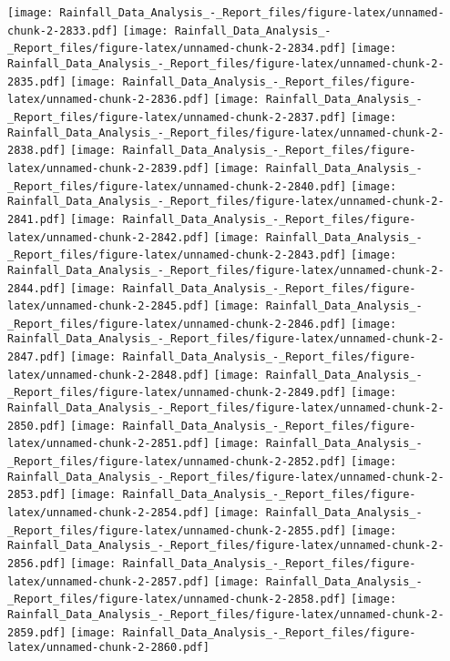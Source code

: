 \documentclass[
]{article}
\begin{document}
\texttt{[image: Rainfall\_Data\_Analysis\_-\_Report\_files/figure-latex/unnamed-chunk-2-2833.pdf]}
\texttt{[image: Rainfall\_Data\_Analysis\_-\_Report\_files/figure-latex/unnamed-chunk-2-2834.pdf]}
\texttt{[image: Rainfall\_Data\_Analysis\_-\_Report\_files/figure-latex/unnamed-chunk-2-2835.pdf]}
\texttt{[image: Rainfall\_Data\_Analysis\_-\_Report\_files/figure-latex/unnamed-chunk-2-2836.pdf]}
\texttt{[image: Rainfall\_Data\_Analysis\_-\_Report\_files/figure-latex/unnamed-chunk-2-2837.pdf]}
\texttt{[image: Rainfall\_Data\_Analysis\_-\_Report\_files/figure-latex/unnamed-chunk-2-2838.pdf]}
\texttt{[image: Rainfall\_Data\_Analysis\_-\_Report\_files/figure-latex/unnamed-chunk-2-2839.pdf]}
\texttt{[image: Rainfall\_Data\_Analysis\_-\_Report\_files/figure-latex/unnamed-chunk-2-2840.pdf]}
\texttt{[image: Rainfall\_Data\_Analysis\_-\_Report\_files/figure-latex/unnamed-chunk-2-2841.pdf]}
\texttt{[image: Rainfall\_Data\_Analysis\_-\_Report\_files/figure-latex/unnamed-chunk-2-2842.pdf]}
\texttt{[image: Rainfall\_Data\_Analysis\_-\_Report\_files/figure-latex/unnamed-chunk-2-2843.pdf]}
\texttt{[image: Rainfall\_Data\_Analysis\_-\_Report\_files/figure-latex/unnamed-chunk-2-2844.pdf]}
\texttt{[image: Rainfall\_Data\_Analysis\_-\_Report\_files/figure-latex/unnamed-chunk-2-2845.pdf]}
\texttt{[image: Rainfall\_Data\_Analysis\_-\_Report\_files/figure-latex/unnamed-chunk-2-2846.pdf]}
\texttt{[image: Rainfall\_Data\_Analysis\_-\_Report\_files/figure-latex/unnamed-chunk-2-2847.pdf]}
\texttt{[image: Rainfall\_Data\_Analysis\_-\_Report\_files/figure-latex/unnamed-chunk-2-2848.pdf]}
\texttt{[image: Rainfall\_Data\_Analysis\_-\_Report\_files/figure-latex/unnamed-chunk-2-2849.pdf]}
\texttt{[image: Rainfall\_Data\_Analysis\_-\_Report\_files/figure-latex/unnamed-chunk-2-2850.pdf]}
\texttt{[image: Rainfall\_Data\_Analysis\_-\_Report\_files/figure-latex/unnamed-chunk-2-2851.pdf]}
\texttt{[image: Rainfall\_Data\_Analysis\_-\_Report\_files/figure-latex/unnamed-chunk-2-2852.pdf]}
\texttt{[image: Rainfall\_Data\_Analysis\_-\_Report\_files/figure-latex/unnamed-chunk-2-2853.pdf]}
\texttt{[image: Rainfall\_Data\_Analysis\_-\_Report\_files/figure-latex/unnamed-chunk-2-2854.pdf]}
\texttt{[image: Rainfall\_Data\_Analysis\_-\_Report\_files/figure-latex/unnamed-chunk-2-2855.pdf]}
\texttt{[image: Rainfall\_Data\_Analysis\_-\_Report\_files/figure-latex/unnamed-chunk-2-2856.pdf]}
\texttt{[image: Rainfall\_Data\_Analysis\_-\_Report\_files/figure-latex/unnamed-chunk-2-2857.pdf]}
\texttt{[image: Rainfall\_Data\_Analysis\_-\_Report\_files/figure-latex/unnamed-chunk-2-2858.pdf]}
\texttt{[image: Rainfall\_Data\_Analysis\_-\_Report\_files/figure-latex/unnamed-chunk-2-2859.pdf]}
\texttt{[image: Rainfall\_Data\_Analysis\_-\_Report\_files/figure-latex/unnamed-chunk-2-2860.pdf]}
\end{document}
